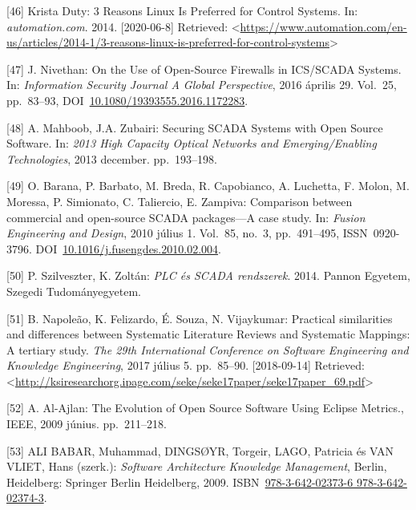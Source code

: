 \documentclass[12pt,magyar,a4paper,oneside]{scrreprt}
\newenvironment{cslreferences}%
  {}%
  {\par}
\begin{document}
\begin{cslreferences}
\leavevmode\hypertarget{ref-krista_duty_3_2014}{}%
{[}46{]} Krista Duty: 3 Reasons Linux Is Preferred for Control Systems.
In: \emph{automation.com}. 2014. {[}2020-06-8{]} Retrieved:
\textless{}\url{https://www.automation.com/en-us/articles/2014-1/3-reasons-linux-is-preferred-for-control-systems}\textgreater{}

\leavevmode\hypertarget{ref-nivethan_use_2016}{}%
{[}47{]} J. Nivethan: On the Use of Open-Source Firewalls in ICS/SCADA
Systems. In: \emph{Information Security Journal A Global Perspective},
2016 április 29. Vol.~25, pp.~83--93,
DOI~\href{https://doi.org/10.1080/19393555.2016.1172283}{10.1080/19393555.2016.1172283}.

\leavevmode\hypertarget{ref-mahboob_securing_2013}{}%
{[}48{]} A. Mahboob, J.A. Zubairi: Securing SCADA Systems with Open
Source Software. In: \emph{2013 High Capacity Optical Networks and
Emerging/Enabling Technologies}, 2013 december. pp.~193--198.

\leavevmode\hypertarget{ref-barana_comparison_2010}{}%
{[}49{]} O. Barana, P. Barbato, M. Breda, R. Capobianco, A. Luchetta, F.
Molon, M. Moressa, P. Simionato, C. Taliercio, E. Zampiva: Comparison
between commercial and open-source SCADA packages---A case study. In:
\emph{Fusion Engineering and Design}, 2010 július 1. Vol.~85, no.~3,
pp.~491--495, ISSN~0920-3796.
DOI~\href{https://doi.org/10.1016/j.fusengdes.2010.02.004}{10.1016/j.fusengdes.2010.02.004}.

\leavevmode\hypertarget{ref-szilveszter_plc_2014}{}%
{[}50{]} P. Szilveszter, K. Zoltán: \emph{PLC és SCADA rendszerek}.
2014. Pannon Egyetem, Szegedi Tudományegyetem.

\leavevmode\hypertarget{ref-napoleao_practical_2017}{}%
{[}51{]} B. Napoleão, K. Felizardo, É. Souza, N. Vijaykumar: Practical
similarities and differences between Systematic Literature Reviews and
Systematic Mappings: A tertiary study. \emph{The 29th International
Conference on Software Engineering and Knowledge Engineering}, 2017
július 5. pp.~85--90. {[}2018-09-14{]} Retrieved:
\textless{}\url{http://ksiresearchorg.ipage.com/seke/seke17paper/seke17paper_69.pdf}\textgreater{}

\leavevmode\hypertarget{ref-al-ajlan_evolution_2009}{}%
{[}52{]} A. Al-Ajlan: The Evolution of Open Source Software Using
Eclipse Metrics., IEEE, 2009 június. pp.~211--218.

\leavevmode\hypertarget{ref-ali_babar_software_2009}{}%
{[}53{]} ALI BABAR, Muhammad, DINGSØYR, Torgeir, LAGO, Patricia és VAN
VLIET, Hans (szerk.): \emph{Software Architecture Knowledge Management},
Berlin, Heidelberg: Springer Berlin Heidelberg, 2009.
ISBN~\href{https://worldcat.org/isbn/978-3-642-02373-6\%20978-3-642-02374-3}{978-3-642-02373-6 978-3-642-02374-3}.


\end{cslreferences}
\end{document}
